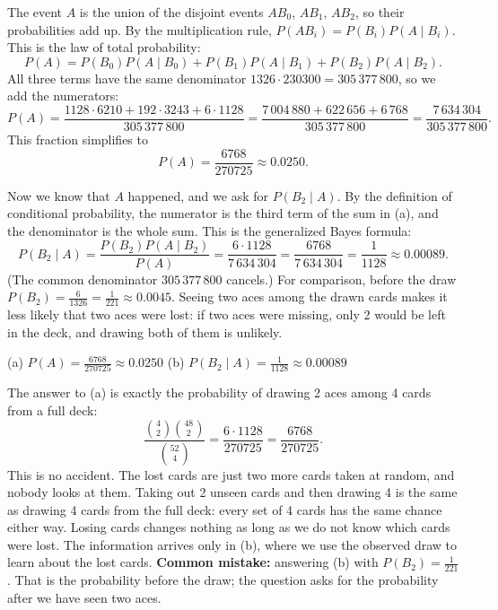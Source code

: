 \begin{solution}
	 The event $A$ is the union of the disjoint events $AB_0$,
	$AB_1$, $AB_2$, so their probabilities add up. By the multiplication rule,
	$P(AB_i)=P(B_i)P(A\mid B_i)$. This is the law of total probability:
	\[ P(A)=P(B_0)P(A\mid B_0)+P(B_1)P(A\mid B_1)+P(B_2)P(A\mid B_2). \]
	All three terms have the same denominator $1326\cdot230300=305\,377\,800$,
	so we add the numerators:
	\[ P(A)=\frac{1128\cdot6210+192\cdot3243+6\cdot1128}{305\,377\,800}
		=\frac{7\,004\,880+622\,656+6\,768}{305\,377\,800}
		=\frac{7\,634\,304}{305\,377\,800}. \]
	This fraction simplifies to
	\[ P(A)=\frac{6768}{270725}\approx0.0250. \]

	 Now we know that $A$ happened, and we ask for $P(B_2\mid A)$. By
	the definition of conditional probability, the numerator is the third term
	of the sum in (a), and the denominator is the whole sum. This is the
	generalized Bayes formula:
	\[ P(B_2\mid A)=\frac{P(B_2)P(A\mid B_2)}{P(A)}
		=\frac{6\cdot1128}{7\,634\,304}=\frac{6768}{7\,634\,304}
		=\frac{1}{1128}\approx0.00089. \]
	(The common denominator $305\,377\,800$ cancels.) For comparison, before
	the draw $P(B_2)=\frac{6}{1326}=\frac{1}{221}\approx0.0045$. Seeing two aces
	among the drawn cards makes it less likely that two aces were lost: if two
	aces were missing, only 2 would be left in the deck, and drawing both of
	them is unlikely.

	\begin{answer}
		(a) $P(A)=\frac{6768}{270725}\approx0.0250$ \quad
		(b) $P(B_2\mid A)=\frac{1}{1128}\approx0.00089$
	\end{answer}
	\begin{remark}
		The answer to (a) is exactly the probability of drawing 2 aces among 4
		cards from a full deck:
		\[ \frac{\binom{4}{2}\binom{48}{2}}{\binom{52}{4}}
			=\frac{6\cdot1128}{270725}=\frac{6768}{270725}. \]
		This is no accident. The lost cards are just two more cards taken at
		random, and nobody looks at them. Taking out 2 unseen cards and then
		drawing 4 is the same as drawing 4 cards from the full deck: every set of
		4 cards has the same chance either way. Losing cards changes nothing as
		long as we do not know which cards were lost. The information arrives
		only in (b), where we use the observed draw to learn about the lost
		cards.
		\textbf{Common mistake:} answering (b) with $P(B_2)=\frac{1}{221}$. That
		is the probability before the draw; the question asks for the
		probability after we have seen two aces.
	\end{remark}
\end{solution}
